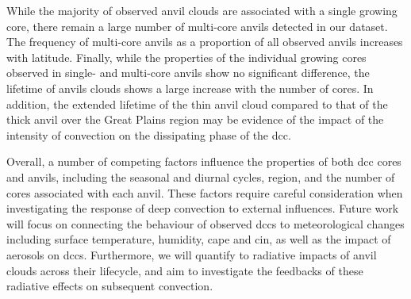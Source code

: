 While the majority of observed anvil clouds are associated with a single growing core, there remain a large number of multi-core anvils detected in our dataset.
The frequency of multi-core anvils as a proportion of all observed anvils increases with latitude.
Finally, while the properties of the individual growing cores observed in single- and multi-core anvils show no significant difference, the lifetime of anvils clouds shows a large increase with the number of cores.
In addition, the extended lifetime of the thin anvil cloud compared to that of the thick anvil over the Great Plains region may be evidence of the impact of the intensity of convection on the dissipating phase of the \acrshort{dcc}.

Overall, a number of competing factors influence the properties of both \acrshort{dcc} cores and anvils, including the seasonal and diurnal cycles, region, and the number of cores associated with each anvil.
These factors require careful consideration when investigating the response of deep convection to external influences.
Future work will focus on connecting the behaviour of observed \acrshort{dcc}s to meteorological changes including surface temperature, humidity, \acrshort{cape} and \acrshort{cin}, as well as the impact of aerosols on \acrshort{dcc}s.
Furthermore, we will quantify to radiative impacts of anvil clouds across their lifecycle, and aim to investigate the feedbacks of these radiative effects on subsequent convection.

